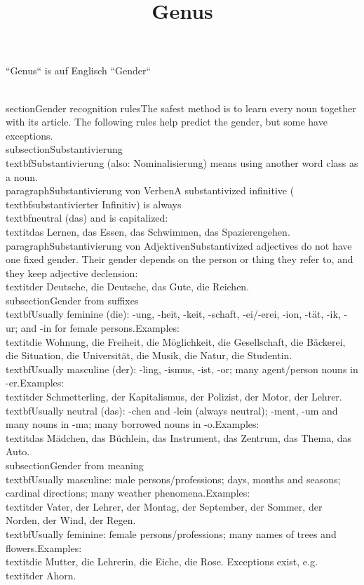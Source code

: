 \documentclass[a4paper]{article}
\title{Genus}
\date{}
\begin{document}
    \maketitle
    ``Genus`` is auf Englisch ``Gender``
    
\n    \\section{Gender recognition rules}\n    The safest method is to learn every noun together with its article. The following rules help predict the gender, but some have exceptions.\n\n    \\subsection{Substantivierung}\n    \\textbf{Substantivierung} (also: Nominalisierung) means using another word class as a noun.\n\n    \\paragraph{Substantivierung von Verben}\n    A substantivized infinitive (\\textbf{substantivierter Infinitiv}) is always \\textbf{neutral (das)} and is capitalized:\n    \\textit{das Lernen, das Essen, das Schwimmen, das Spazierengehen}.\n\n    \\paragraph{Substantivierung von Adjektiven}\n    Substantivized adjectives do not have one fixed gender. Their gender depends on the person or thing they refer to, and they keep adjective declension:\n    \\textit{der Deutsche, die Deutsche, das Gute, die Reichen}.\n\n    \\subsection{Gender from suffixes}\n    \\textbf{Usually feminine (die):} -ung, -heit, -keit, -schaft, -ei/-erei, -ion, -tät, -ik, -ur; and -in for female persons.\n    Examples: \\textit{die Wohnung, die Freiheit, die Möglichkeit, die Gesellschaft, die Bäckerei, die Situation, die Universität, die Musik, die Natur, die Studentin}.\n\n    \\textbf{Usually masculine (der):} -ling, -ismus, -ist, -or; many agent/person nouns in -er.\n    Examples: \\textit{der Schmetterling, der Kapitalismus, der Polizist, der Motor, der Lehrer}.\n\n    \\textbf{Usually neutral (das):} -chen and -lein (always neutral); -ment, -um and many nouns in -ma; many borrowed nouns in -o.\n    Examples: \\textit{das Mädchen, das Büchlein, das Instrument, das Zentrum, das Thema, das Auto}.\n\n    \\subsection{Gender from meaning}\n    \\textbf{Usually masculine:} male persons/professions; days, months and seasons; cardinal directions; many weather phenomena.\n    Examples: \\textit{der Vater, der Lehrer, der Montag, der September, der Sommer, der Norden, der Wind, der Regen}.\n\n    \\textbf{Usually feminine:} female persons/professions; many names of trees and flowers.\n    Examples: \\textit{die Mutter, die Lehrerin, die Eiche, die Rose}. Exceptions exist, e.g. \\textit{der Ahorn}.\n\n    
\end{document}
